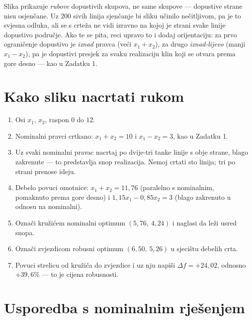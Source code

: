 \begin{zamka}
Slika prikazuje \emph{rubove} dopustivih skupova, ne same skupove --- dopustive
strane nisu osjenčane. Uz $200$ sivih linija sjenčanje bi sliku učinilo
nečitljivom, pa je to svjesna odluka, ali se s crteža ne vidi izravno na kojoj je
strani svake linije dopustivo područje. Ako te se pita, reci upravo to i dodaj
orijentaciju: za prvo ograničenje dopustivo je \emph{iznad} pravca (veći
$x_1 + x_2$), za drugo \emph{iznad-lijevo} (manji $x_1 - x_2$), pa je dopustivi
presjek za svaku realizaciju klin koji se otvara prema gore desno --- kao u
Zadatku 1.
\end{zamka}

\section{Kako sliku nacrtati rukom}
\label{sec:z2-crtanje}

\begin{ploca}
\begin{enumerate}[leftmargin=*]
  \item Osi $x_1$, $x_2$, raspon $0$ do $12$.
  \item Nominalni pravci crtkano: $x_1 + x_2 = 10$ i $x_1 - x_2 = 3$, kao u
        Zadatku 1.
  \item Uz svaki nominalni pravac nacrtaj po dvije-tri tanke linije s obje strane,
        blago zakrenute --- to predstavlja snop realizacija. Nemoj crtati sto
        linija; tri po strani prenose ideju.
  \item Debelo povuci omotnice: $x_1 + x_2 = 11{,}76$ (paralelno s nominalnim,
        pomaknuto prema gore desno) i $1{,}15x_1 - 0{,}85x_2 = 3$ (blago
        zakrenuto u odnosu na nominalni).
  \item Označi kružićem nominalni optimum $(5{,}76,\ 4{,}24)$ i naglasi da leži
        usred snopa.
  \item Označi zvjezdicom robusni optimum $(6{,}50,\ 5{,}26)$ u sjecištu debelih
        crta.
  \item Povuci strelicu od kružića do zvjezdice i uz nju napiši
        $\Delta f = +24{,}02$, odnosno $+39{,}6\%$ --- to je cijena robusnosti.
\end{enumerate}
\end{ploca}

\section{Usporedba s nominalnim rješenjem}
\label{sec:z2-usporedba}

